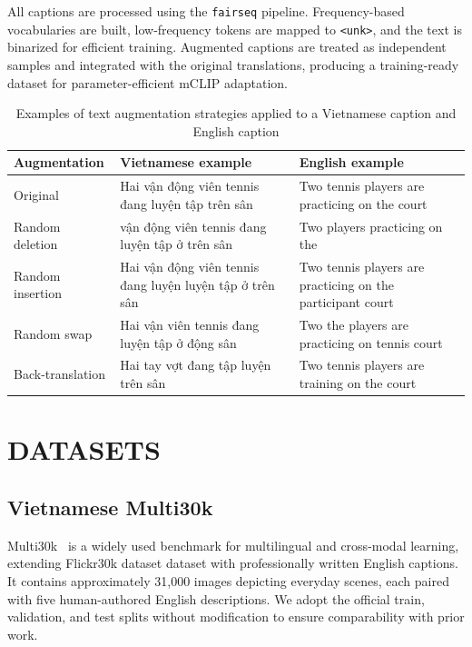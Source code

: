 All captions are processed using the \texttt{fairseq} pipeline. Frequency-based vocabularies are built, low-frequency tokens are mapped to \texttt{<unk>}, and the text is binarized for efficient training. Augmented captions are treated as independent samples and integrated with the original translations, producing a training-ready dataset for parameter-efficient mCLIP adaptation.
\begin{table}[ht]
\centering
\caption{Examples of text augmentation strategies applied to a Vietnamese caption and English caption}
\label{tab:augmentation}
\begin{tabular}{|l|p{5cm}|p{5cm}|}
\hline
\textbf{Augmentation} & \textbf{Vietnamese example} & \textbf{English example} \\
\hline
Original &
Hai vận động viên tennis đang luyện tập trên sân &
Two tennis players are practicing on the court \\
\hline
Random deletion &
vận động viên tennis đang luyện tập ở trên sân &
Two players practicing on the \\
\hline
Random insertion &
Hai vận động viên tennis đang luyện luyện tập ở trên sân &
Two tennis players are practicing on the participant court \\
\hline
Random swap &
Hai vận viên tennis đang luyện tập ở động sân &
Two the players are practicing on tennis court \\
\hline
Back-translation &
Hai tay vợt đang tập luyện trên sân &
Two tennis players are training on the court \\
\hline
\end{tabular}
\end{table}
\section{DATASETS}
\label{sec:dataset}

\subsection{Vietnamese Multi30k}

Multi30k~\cite{elliott2016multi30k} is a widely used benchmark for multilingual and cross-modal learning, extending Flickr30k dataset \cite{plummer2016flickr30kentitiescollectingregiontophrase} dataset with professionally written English captions. It contains approximately 31{,}000 images depicting everyday scenes, each paired with five human-authored English descriptions. We adopt the official train, validation, and test splits without modification to ensure comparability with prior work.

